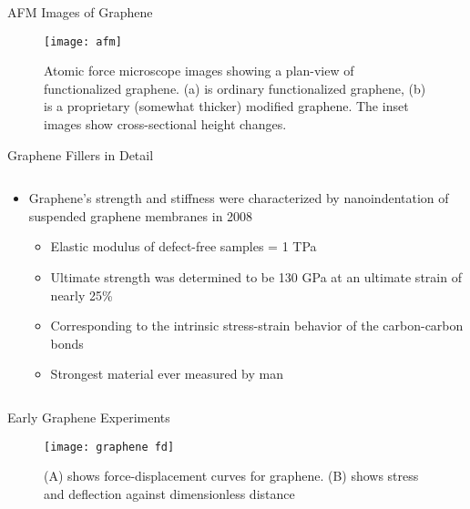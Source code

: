 \documentclass[12pt,letterpaper]{beamer}
\begin{document}
\begin{frame}{AFM Images of Graphene}
\begin{figure}
  \centering
    \texttt{[image: afm]}
    \caption[Tapping-mode AFM images of functionalized graphene]{Atomic force microscope images showing a plan-view of functionalized graphene. (a) is ordinary functionalized graphene, (b) is a proprietary (somewhat thicker) modified graphene. The inset images show cross-sectional height changes.}
\end{figure}
\end{frame}

\begin{frame}{Graphene Fillers in Detail}
  \begin{columns}[T]
      \begin{column}{\textwidth}
     \begin{block}{}
\begin{itemize}
\item Graphene's strength and stiffness were characterized by nanoindentation of suspended graphene membranes in 2008
\begin{itemize}
\item Elastic modulus of defect-free samples = 1 TPa
\item Ultimate strength was determined to be 130 GPa at an ultimate strain of nearly 25\% \cite{lee2008measurement} 
\item Corresponding to the intrinsic stress-strain behavior of the carbon-carbon bonds 
\item Strongest material ever measured by man
\end{itemize}
\end{itemize}
    \end{block}      
    \end{column}
  \end{columns}
\end{frame}

\begin{frame}{Early Graphene Experiments}
\begin{figure}
  \begin{center}
    \texttt{[image: graphene fd]}
  \end{center}
  \caption[Tensile strength improvements for graphene nanocomposites]{(A) shows force-displacement curves for graphene. (B) shows stress and deflection against dimensionless distance}
\end{figure}
\end{frame}
\end{document}
